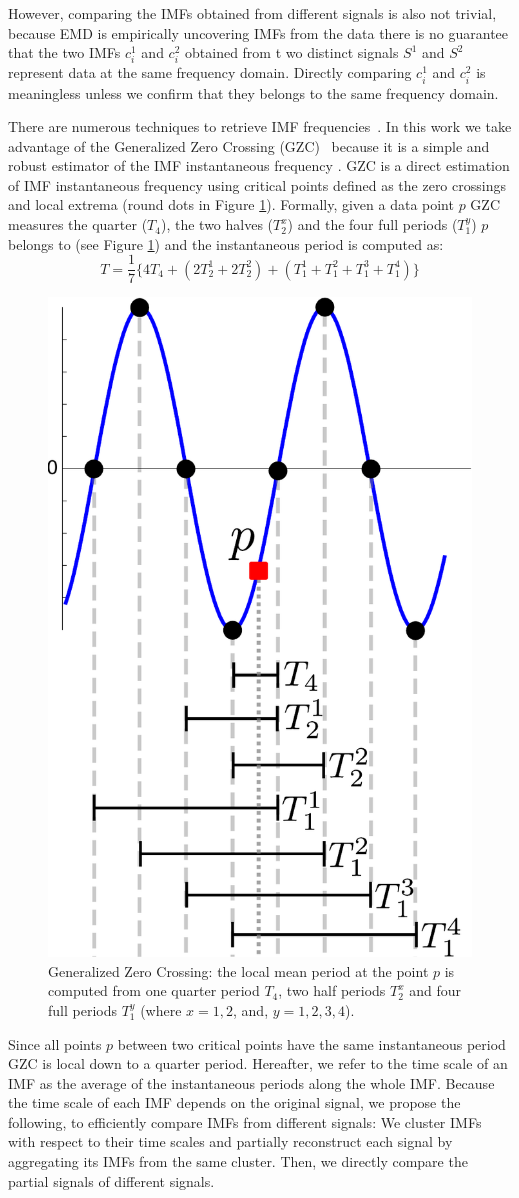 However, comparing the IMFs obtained from different signals is also not trivial,
 because EMD is empirically uncovering IMFs from the data there is no guarantee that the two IMFs $c_i^1$ and $c_i^2$ obtained from t
 wo distinct signals $S^1$ and $S^2$ represent data at the same frequency domain.
Directly comparing $c_i^1$ and $c_i^2$ is meaningless unless we confirm that they belongs to the same frequency domain.

There are numerous techniques to retrieve IMF frequencies~\cite{huang:aada2009}.  
In this work we take advantage of the Generalized Zero Crossing (GZC)~\cite{huang:patent2006} because it is a simple and robust 
estimator of the IMF instantaneous frequency \cite{huang:aada2009}.
GZC is a direct estimation of IMF instantaneous frequency using critical points defined as the zero crossings and local extrema 
(round dots in Figure \ref{fig:gzc}).
Formally, given a data point $p$ GZC measures the quarter ($T_4$), the two halves ($T_2^x$) and the four full periods ($T_1^y$) $p$  belongs to (see Figure \ref{fig:gzc}) and the instantaneous period is computed as:
\[T=\frac{1}{7}\{4T_4+(2T_2^1+2T_2^2)+(T_1^1+T_1^2+T_1^3+T_1^4)\}\]

\begin{figure}
\begin{center}
 \includegraphics[width=.25\textwidth]{img/gzc.pdf}
 \end{center}
 \caption{Generalized Zero Crossing: the local mean period at the point $p$ is computed from one quarter period $T_4$, two half periods $T_2^x$ and four full periods $T_1^y$ (where $x=1, 2$, and, $y=1,2,3,4$).}
 \label{fig:gzc}
\end{figure}

Since all points $p$ between two critical points have the same instantaneous period GZC is local down to a quarter period.
Hereafter, we refer to the time scale of an IMF as the average of the instantaneous periods along the whole IMF.
Because the time scale of each IMF depends on the original signal, we propose the following, to efficiently compare IMFs from different signals:  
We cluster IMFs with respect to their time scales and partially reconstruct each signal by aggregating its IMFs from the 
same cluster.  Then, we directly compare the partial signals of different signals.

